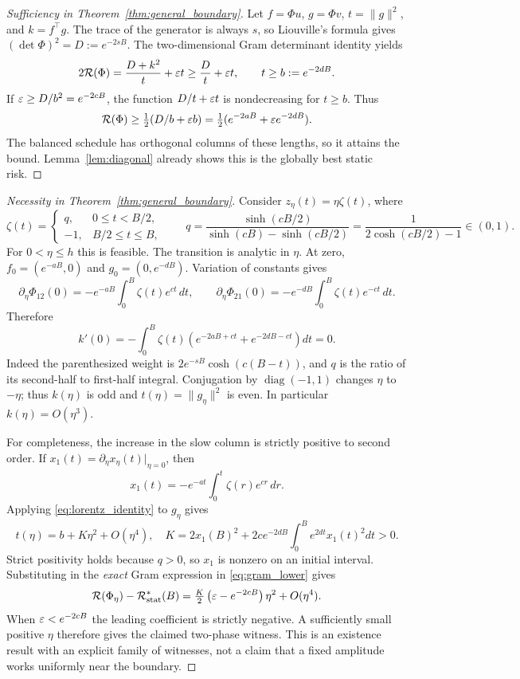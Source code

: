 \begin{proof}[Sufficiency in Theorem~\ref{thm:general_boundary}]
Let $f=\Phi u$, $g=\Phi v$, $t=\|g\|^2$, and $k=f^\top g$. The trace of the generator is always $s$, so Liouville's formula gives $(\det\Phi)^2=D:=e^{-2sB}$. The two-dimensional Gram determinant identity yields
\begin{equation}
 2\mathcal R(\Phi)=\frac{D+k^2}{t}+\varepsilon t\ge\frac{D}{t}+\varepsilon t,
 \qquad t\ge b:=e^{-2dB}.
 \label{eq:gram_lower}
\end{equation}
If $\varepsilon\ge D/b^2=e^{-2cB}$, the function $D/t+\varepsilon t$ is nondecreasing for $t\ge b$. Thus
\[
 \mathcal R(\Phi)\ge\tfrac12(D/b+\varepsilon b)
 =\tfrac12(e^{-2aB}+\varepsilon e^{-2dB}).
\]
The balanced schedule has orthogonal columns of these lengths, so it attains the bound. Lemma~\ref{lem:diagonal} already shows this is the globally best static risk.
\end{proof}

\begin{proof}[Necessity in Theorem~\ref{thm:general_boundary}]
Consider $z_\eta(t)=\eta\zeta(t)$, where
\[
 \zeta(t)=\begin{cases}q,&0\le t<B/2,\\-1,&B/2\le t\le B,\end{cases}
 \qquad
 q=\frac{\sinh(cB/2)}{\sinh(cB)-\sinh(cB/2)}
 =\frac1{2\cosh(cB/2)-1}\in(0,1).
\]
For $0<\eta\le h$ this is feasible. The transition is analytic in $\eta$. At zero, $f_0=(e^{-aB},0)$ and $g_0=(0,e^{-dB})$. Variation of constants gives
\[
 \partial_\eta\Phi_{12}(0)=-e^{-aB}\int_0^B\zeta(t)e^{ct}\,dt,
 \qquad
 \partial_\eta\Phi_{21}(0)=-e^{-dB}\int_0^B\zeta(t)e^{-ct}\,dt.
\]
Therefore
\[
 k'(0)=-\int_0^B \zeta(t)\left(e^{-2aB+ct}+e^{-2dB-ct}\right)dt=0.
\]
Indeed the parenthesized weight is $2e^{-sB}\cosh(c(B-t))$, and $q$ is the ratio of its second-half to first-half integral. Conjugation by $\operatorname{diag}(-1,1)$ changes $\eta$ to $-\eta$; thus $k(\eta)$ is odd and $t(\eta)=\|g_\eta\|^2$ is even. In particular $k(\eta)=O(\eta^3)$.

For completeness, the increase in the slow column is strictly positive to second order. If $x_1(t)=\partial_\eta x_\eta(t)|_{\eta=0}$, then
\[
 x_1(t)=-e^{-at}\int_0^t\zeta(r)e^{cr}\,dr.
\]
Applying \eqref{eq:lorentz_identity} to $g_\eta$ gives
\[
 t(\eta)=b+K\eta^2+O(\eta^4),\quad
 K=2x_1(B)^2+2c e^{-2dB}\int_0^B e^{2dt}x_1(t)^2dt>0.
\]
Strict positivity holds because $q>0$, so $x_1$ is nonzero on an initial interval. Substituting in the \emph{exact} Gram expression in \eqref{eq:gram_lower} gives
\begin{equation}
 \mathcal R(\Phi_\eta)-\mathcal R_{\mathrm{stat}}^*(B)
 =\tfrac K2\left(\varepsilon-e^{-2cB}\right)\eta^2+O(\eta^4).
 \label{eq:boundary_variation}
\end{equation}
When $\varepsilon<e^{-2cB}$ the leading coefficient is strictly negative. A sufficiently small positive $\eta$ therefore gives the claimed two-phase witness. This is an existence result with an explicit family of witnesses, not a claim that a fixed amplitude works uniformly near the boundary.
\end{proof}


